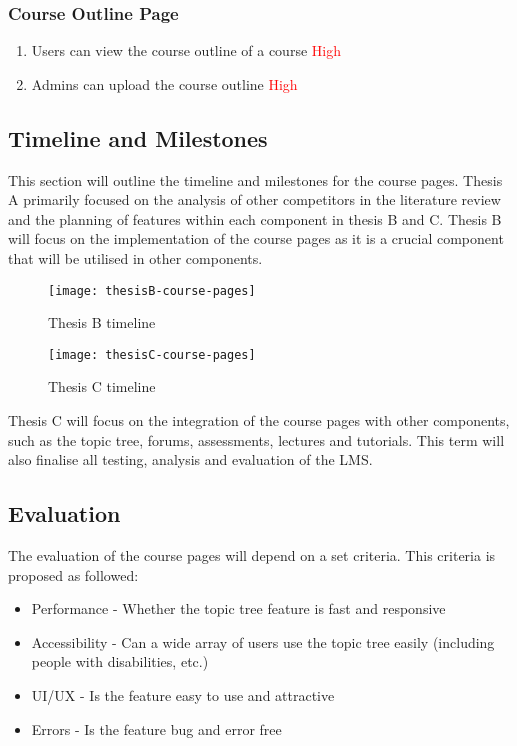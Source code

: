 \subsubsection{Course Outline Page}
\begin{enumerate}
    \item Users can view the course outline of a course \textcolor{Red}{High}
    \item Admins can upload the course outline \textcolor{Red}{High}
\end{enumerate}

\subsection{Timeline and Milestones}
This section will outline the timeline and milestones for the course pages.
Thesis A primarily focused on the analysis of other competitors in the literature review and the planning of features within each component in thesis B and C.
Thesis B will focus on the implementation of the course pages as it is a crucial component that will be utilised in other components.
\begin{figure}[h]
    \centering
    \texttt{[image: thesisB-course-pages]}
    \caption{Thesis B timeline}
\end{figure}

\begin{figure}[h]
    \centering
    \texttt{[image: thesisC-course-pages]}
    \caption{Thesis C timeline}
\end{figure}

Thesis C will focus on the integration of the course pages with other components, such as the topic tree, forums, assessments, lectures and tutorials.
This term will also finalise all testing, analysis and evaluation of the LMS.

\subsection{Evaluation}
The evaluation of the course pages will depend on a set criteria.
This criteria is proposed as followed:
\begin{itemize}
    \item Performance - Whether the topic tree feature is fast and responsive
    \item Accessibility - Can a wide array of users use the topic tree easily (including people with disabilities, etc.)
    \item UI/UX - Is the feature easy to use and attractive
    \item Errors - Is the feature bug and error free
\end{itemize}

